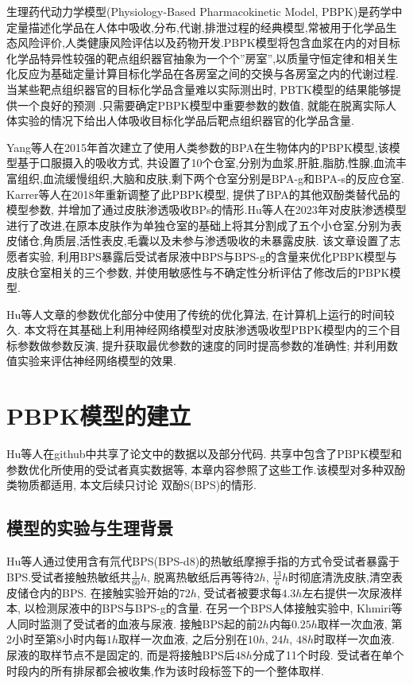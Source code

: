 \documentclass[a4paper,punct=banjiao,twoside]{ctexrep}
\theoremstyle{plain}
\theoremstyle{definition}
\theoremstyle{remark}
\begin{document}
生理药代动力学模型(Physiology-Based Pharmacokinetic Model, PBPK)是药学中定量描述化学品在人体中吸收,分布,代谢,排泄过程的经典模型,常被用于化学品生态风险评价,人类健康风险评估以及药物开发\cite{7}.PBPK模型将包含血浆在内的对目标化学品特异性较强的靶点组织器官抽象为一个个”房室”,以质量守恒定律和相关生化反应为基础定量计算目标化学品在各房室之间的交换与各房室之内的代谢过程\cite{8}.当某些靶点组织器官的目标化学品含量难以实际测出时, PBTK模型的结果能够提供一个良好的预测 \cite{7}.只需要确定PBPK模型中重要参数的数值, 就能在脱离实际人体实验的情况下给出人体吸收目标化学品后靶点组织器官的化学品含量.

Yang等人在2015年首次建立了使用人类参数的BPA在生物体内的PBPK模型,该模型基于口服摄入的吸收方式, 共设置了10个仓室,分别为血浆,肝脏,脂肪,性腺,血流丰富组织,血流缓慢组织,大脑和皮肤,剩下两个仓室分别是BPA-g和BPA-s的反应仓室\cite{10}. Karrer等人在2018年重新调整了此PBPK模型, 提供了BPA的其他双酚类替代品的模型参数, 并增加了通过皮肤渗透吸收BPs的情形\cite{9}.Hu等人在2023年对皮肤渗透模型进行了改进,在原本皮肤作为单独仓室的基础上将其分割成了五个小仓室,分别为表皮储仓,角质层,活性表皮,毛囊以及未参与渗透吸收的未暴露皮肤\cite{11}.
该文章设置了志愿者实验, 利用BPS暴露后受试者尿液中BPS与BPS-g的含量来优化PBPK模型与皮肤仓室相关的三个参数, 并使用敏感性与不确定性分析评估了修改后的PBPK模型.

Hu等人文章的参数优化部分中使用了传统的优化算法, 在计算机上运行的时间较久. 本文将在其基础上利用神经网络模型对皮肤渗透吸收型PBPK模型内的三个目标参数做参数反演, 提升获取最优参数的速度的同时提高参数的准确性; 并利用数值实验来评估神经网络模型的效果.


\chapter{PBPK模型的建立}
Hu等人\cite{11}在github中共享了论文中的数据以及部分代码\cite{12}. 共享中包含了PBPK模型和参数优化所使用的受试者真实数据等, 本章内容参照了这些工作.该模型对多种双酚类物质都适用, 本文后续只讨论
双酚S(BPS)的情形.
\section{模型的实验与生理背景}
Hu\cite{11}等人通过使用含有氘代BPS(BPS-d8)的热敏纸摩擦手指的方式令受试者暴露于BPS.受试者接触热敏纸共$\frac{1}{60}h$, 脱离热敏纸后再等待$2h$, $\frac{13}{6}h$时彻底清洗皮肤,清空表皮储仓内的BPS.
在接触实验开始的$72h$, 受试者被要求每$4.3h$左右提供一次尿液样本, 以检测尿液中的BPS与BPS-g的含量.
在另一个BPS人体接触实验中, Khmiri等人\cite{13}同时监测了受试者的血液与尿液. 接触BPS起的前$2h$内每$0.25h$取样一次血液, 第2小时至第8小时内每$1h$取样一次血液, 之后分别在$10h$, $24h$, $48h$时取样一次血液.
尿液的取样节点不是固定的, 而是将接触BPS后$48h$分成了11个时段. 受试者在单个时段内的所有排尿都会被收集,作为该时段标签下的一个整体取样. 
\end{document}
